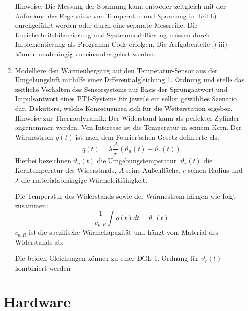 \documentclass{report}
\begin{document}
\begin{enumerate}
\begin{enumerate}
\end{enumerate}
Hinweise: Die Messung der Spannung kann entweder zeitgleich mit der Aufnahme der Ergebnisse von Temperatur und Spannung in Teil b) durchgeführt werden oder durch eine separate Messreihe.
Die Unsicherheitsbilanzierung und Systemmodellierung müssen durch Implementierung als Programm-Code
erfolgen.
Die Aufgabenteile i)-iii) können unabhängig voneinander gelöst werden.
\item Modelliere den Wärmeübergang auf den Temperatur-Sensor aus der Umgebungsluft mithilfe einer
Differentialgleichung 1. Ordnung und stelle das zeitliche Verhalten des Sensorsystems auf Basis der
Sprungantwort und Impulsantwort eines PT1-Systems für jeweils ein selbst gewähltes Szenario dar. Diskutiere,
welche Konsequenzen sich für die Wetterstation ergeben.
Hinweise zur Thermodynamik: Der Widerstand kann als perfekter Zylinder angenommen werden. Von
Interesse ist die Temperatur in seinem Kern. Der Wärmestrom \begin{math} q\left(t\right)\end{math} ist nach dem Fourier’schen Gesetz definiertc als:
\begin{displaymath}
q\left(t\right) = \lambda \frac{A}{r} \left(\vartheta_u\left(t\right) - \vartheta_r\left(t\right) \right)
\end{displaymath}
Hierbei bezeichnen $\vartheta_u\left(t\right)$ die Umgebungstemperatur, $\vartheta_r\left(t\right)$ die Kerntemperatur des Widerstands, $A$ seine Außenfläche, $r$ seinen Radius und $\lambda$ die materialabhängige Wärmeleitfähigkeit. 

Die Temperatur des Widerstands sowie der Wärmestrom hängen wie folgt zusammen:
\[
\frac{1}{c_{p,R}}\int{q\left(t\right) dt} = \vartheta_r\left(t\right)
\]
$c_{p,R}$ ist die spezifische Wärmekapazität und hängt vom Material des Widerstands ab. 

Die beiden Gleichungen können zu einer DGL 1. Ordnung für $\vartheta_r\left(t\right)$ kombiniert werden.

\end{enumerate}
\section{Hardware}
\end{document}
